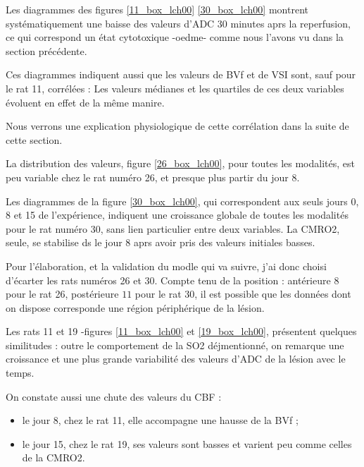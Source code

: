 \etoile
Les diagrammes des figures \ref{11_box_lch00}  \ref{30_box_lch00} montrent syst\'ematiquement une baisse des valeurs d'ADC 30 minutes aprs la reperfusion, %
ce qui correspond  un \'etat cytotoxique -oedme- comme nous l'avons vu dans la section pr\'ec\'edente.

\par
Ces diagrammes indiquent aussi que les valeurs de BVf et de VSI sont, sauf pour le rat 11, corr\'el\'ees : %
Les valeurs m\'edianes et les quartiles de ces deux variables \'evoluent en effet de la m\^eme manire.

\par
Nous verrons une explication physiologique de cette corr\'elation dans la suite de cette section.

\etoile
La distribution des valeurs, figure \ref{26_box_lch00}, pour toutes les modalit\'es, est peu variable chez le rat num\'ero 26, et presque plus  partir du jour 8.

\par
Les diagrammes de la figure \ref{30_box_lch00}, qui correspondent aux seuls jours 0, 8 et 15 de l'exp\'erience, %
indiquent une croissance globale de toutes les modalit\'es pour le rat num\'ero 30, %
sans lien particulier entre deux variables. %
La CMRO2, seule, se stabilise ds le jour 8 aprs avoir pris des valeurs initiales basses.

\par
Pour l'\'elaboration, et la validation du modle qui va suivre, j'ai donc choisi d'\'ecarter les rats num\'eros 26 et 30. %
Compte tenu de la position : ant\'erieure  $8$ pour le rat 26, post\'erieure  $11$ pour le rat 30, %
il est possible que les donn\'ees dont on dispose corresponde  une r\'egion p\'eriph\'erique de la l\'esion.

\etoile
Les rats 11 et 19 -figures \ref{11_box_lch00} et \ref{19_box_lch00}, pr\'esentent quelques similitudes : %
outre le comportement de la SO2 d\'ejmentionn\'e, on remarque une croissance et une plus grande variabilit\'e des valeurs d'ADC de la l\'esion avec le temps.

\par
On constate aussi une chute des valeurs du CBF :
\begin{itemize}
\item le jour 8, chez le rat 11, elle accompagne une hausse de la BVf ;
\item le jour 15, chez le rat 19, ses valeurs sont basses et varient peu comme celles de la CMRO2.
\end{itemize}

